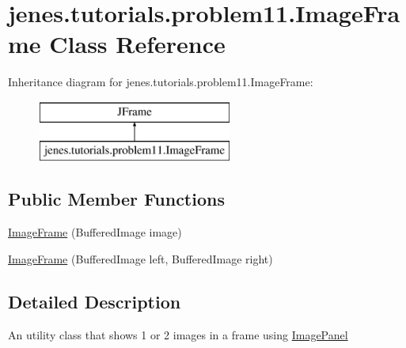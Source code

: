 \hypertarget{classjenes_1_1tutorials_1_1problem11_1_1_image_frame}{\section{jenes.\-tutorials.\-problem11.\-Image\-Frame Class Reference}
\label{classjenes_1_1tutorials_1_1problem11_1_1_image_frame}
}
Inheritance diagram for jenes.\-tutorials.\-problem11.\-Image\-Frame\-:\begin{figure}[H]
\begin{center}
\leavevmode
\includegraphics[height=2.000000cm]{classjenes_1_1tutorials_1_1problem11_1_1_image_frame}
\end{center}
\end{figure}
\subsection*{Public Member Functions}
\begin{DoxyCompactItemize}
\item 
\hyperlink{classjenes_1_1tutorials_1_1problem11_1_1_image_frame_ae07ab83a8781fd5748c34fd4c0ef4cfb}{Image\-Frame} (Buffered\-Image image)
\item 
\hyperlink{classjenes_1_1tutorials_1_1problem11_1_1_image_frame_a7cdded840043588eef66524cdab0af13}{Image\-Frame} (Buffered\-Image left, Buffered\-Image right)
\end{DoxyCompactItemize}


\subsection{Detailed Description}
An utility class that shows 1 or 2 images in a frame using \hyperlink{classjenes_1_1tutorials_1_1problem11_1_1_image_panel}{Image\-Panel} 

